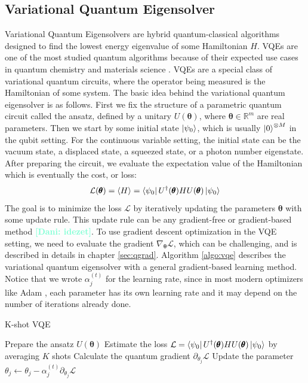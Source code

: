 \documentclass[12pt, a4paper,  nobibnotes]{article}
\newcommand{\nd}[1]{\textcolor{Aquamarine}{\textbf{[Dani: #1]}}}
\begin{document}
\subsection{Variational Quantum Eigensolver}
\label{sec:vqe}
Variational Quantum Eigensolvers \cite{Peruzzo2014} are hybrid quantum-classical algorithms 
designed to find the lowest energy eigenvalue of some Hamiltonian $H$. VQEs are one 
of the most studied quantum algorithms because of their expected use cases in 
quantum chemistry and materials science 
\cite{Wei2020-QCHEM,VQE-HARTREE-FOCK,Kandala2017-VQE-QCHEM,PhysRevX-VQE-QCHEM}.
VQEs are a special class of variational quantum circuits, where the operator being 
measured is the Hamiltonian of some system.
The basic idea behind the variational quantum eigensolver is as follows. 
First we fix the structure of a parametric quantum circuit called the ansatz, defined by a 
unitary $U(\pmb\theta)$, where $\pmb\theta\in\mathbb{R}^m$ are real parameters. 
Then we start by some initial state $\ket{\psi_0}$, which is usually $\ket 0^{\otimes M}$ 
in the qubit setting. For the continuous variable setting, the initial state can be the vacuum state,
a displaced state, a squeezed state, or a photon number eigenstate.
After preparing the circuit, we evaluate the expectation value of the Hamiltonian
which is eventually the cost, or loss:
\begin{equation}
    \mathcal L(\pmb\theta) = \langle H \rangle = \bra{\psi_0}U^{\dagger}(\pmb\theta)HU(\pmb\theta)\ket{\psi_0}
\end{equation}
The goal is to minimize the loss $\mathcal L$ by iteratively updating the parameters $\pmb\theta$ with some update rule. This update rule can be any gradient-free \cite{Zhu2019} or gradient-based method \nd{idezet}. To use gradient descent optimization in the VQE setting, we need to evaluate the gradient
$\nabla_{\pmb\theta}\mathcal L$, which can be challenging, and is described in details in chapter \ref{sec:qgrad}. Algorithm \ref{algo:vqe} describes 
the variational quantum eigensolver with a general gradient-based learning method. Notice that we wrote $\alpha_j^{(t)}$ for the learning rate, since in most modern optimizers like Adam \cite{Kingma2015AdamAM}, each parameter has its own learning rate and it may depend on the number of iterations already done.
\begin{algorithm}[H]
    \caption{K-shot VQE}
    \begin{algorithmic}[1]
            \State Prepare the ansatz $U(\pmb\theta)$
            \State Estimate the loss $\mathcal L = \bra{\psi_0}U^{\dagger}(\pmb\theta)HU(\pmb\theta)\ket{\psi_0}$ by averaging $K$ shots
                \State Calculate the quantum gradient $\partial_{\theta_j}\mathcal L$
                \State Update the parameter $\theta_j \leftarrow \theta_j - \alpha_j^{(t)}\partial_{\theta_j}\mathcal L$
            \EndFor
        \EndFor
    \EndProcedure
    \end{algorithmic}
    \label{algo:vqe}
\end{algorithm}
\end{document}
